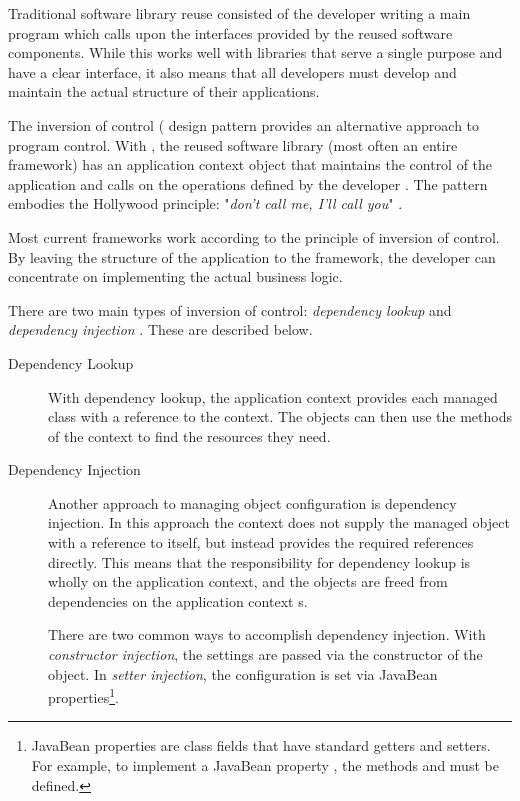 Traditional software library reuse consisted of the developer writing 
a main program which calls upon the interfaces provided by the reused 
software components. While this works well with libraries that serve a 
single purpose and have a clear interface, it also means that all 
developers must develop and maintain the actual structure of their 
applications.

The inversion of control ( design pattern provides an 
alternative approach to program control. With , the reused 
software library (most often an entire framework) has an application 
context object that maintains the control of the application and calls 
on the operations defined by the developer 
\citep{fweqcomppat,parviainen}. The  pattern embodies the 
Hollywood principle: "\textsl{don't call me, I'll call you}" 
\citep{j2eednd}.

Most current frameworks work according to the principle of inversion 
of control. By leaving the structure of the application to the 
framework, the developer can concentrate on implementing the actual 
business logic.

There are two main types of inversion of control: \textsl{dependency 
lookup} and \textsl{dependency injection} \citep{rapidspring}. These
are described below.

\begin{description}
\item[Dependency Lookup] With dependency lookup, the application 
context provides each managed class with a reference to the context. 
The objects can then use the  methods of the context to 
find the resources they need.

\item[Dependency Injection] Another approach to managing object 
configuration is dependency injection. In this approach the context 
does not supply the managed object with a reference to itself, but 
instead provides the required references directly. This means that the 
responsibility for dependency lookup is wholly on the application 
context, and the objects are freed from dependencies on the 
application context s.
\citep{rapidspring}

There are two common ways to accomplish dependency injection. With 
\textsl{constructor injection}, the settings are passed via the 
constructor of the object. In \textsl{setter injection}, the 
configuration is set via JavaBean properties\footnote{JavaBean 
properties are class fields that have standard getters and setters. 
For example, to implement a JavaBean property , the 
methods  and  must be 
defined.}.

\end{description}


